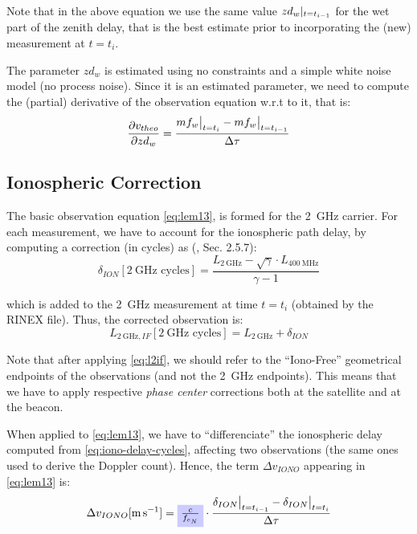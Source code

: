 Note that in the above equation we use the same value $zd_{w}|_{t=t_{i-1}}$ 
for the wet part of the zenith delay, that is the best estimate prior to 
incorporating the (new) measurement at $t=t_i$.

The parameter $zd_{w}$ is estimated using no constraints and a simple white 
noise model (no process noise). Since it is an estimated parameter, we need 
to compute the (partial) derivative of the observation equation w.r.t to it, 
that is:
\begin{equation}
  \frac{\partial v_{theo}}{\partial zd_{w}} = \frac{mf_{w}\at[\big]{t=t_i} 
    - mf_{w}\at[\big]{t=t_{i-1}}}{\Delta \tau}
  \label{eq:partials-zwd}
\end{equation}

\subsection{Ionospheric Correction}
\label{ssec:iono-correction}
The basic observation equation \ref{eq:lem13}, is formed for the \SI{2}{\GHz} 
carrier. For each measurement, we have to account for the ionospheric path 
delay, by computing a correction (in cycles) as (\cite{lemoine-2016}, Sec. 2.5.7):
\begin{equation}
  \delta_{ION} [\SI{2}{\GHz}\text{ cycles}] = 
    \frac{L_{\SI{2}{\GHz}} - \sqrt{\gamma} \cdot L_{\SI{400}{\MHz}}}{\gamma - 1}
  \label{eq:iono-delay-cycles}
\end{equation}

which is added to the \SI{2}{\GHz} measurement at time $t=t_i$ (obtained by the 
RINEX file). Thus, the corrected observation is:
\begin{equation}
  L_{\SI{2}{\GHz},IF} [\SI{2}{\GHz}\text{ cycles}] = 
    L_{\SI{2}{\GHz}} + \delta_{ION}
  \label{eq:l2if}
\end{equation}

Note that after applying \ref{eq:l2if}, we should refer to the ``Iono-Free'' 
geometrical endpoints of the observations (and not the \SI{2}{\GHz} endpoints). 
This means that we have to apply respective \emph{phase center} corrections 
both at the satellite and at the beacon.

When applied to \ref{eq:lem13}, we have to ``differenciate'' the ionospheric 
delay computed from \ref{eq:iono-delay-cycles}, affecting two observations 
(the same ones used to derive the Doppler count). Hence, the term 
$\Delta v_{IONO}$ appearing in \ref{eq:lem13} is:
\begin{equation}
  \Delta v_{IONO} [\si{\m \per \s}] = 
    \tikz[baseline]{
      \node[fill=blue!20,anchor=base](en1){$\frac{c}{f_{e_N}}$};
    }
    \cdot 
    \frac{\delta_{ION}\at[\big]{t=t_{i-1}} 
    - \delta_{ION}\at[\big]{t=t_i}}{\Delta \tau}
  \label{eq:dion-diff}
\end{equation}

